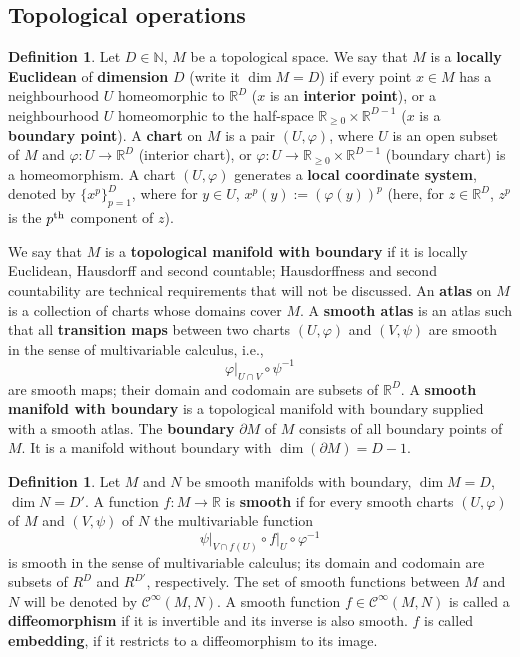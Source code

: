\documentclass{elsarticle}
\theoremstyle{definition}
\newtheorem{definition}[theorem]{Definition}
\newcommand{\N}{\mathbb{N}}
\newcommand{\R}{\mathbb{R}}
\newcommand{\restrict}[2]{\left.#1\right|_{#2}}
\newcommand{\newterm}[1]{\textbf{#1}}
\begin{document}
\subsection{Topological operations}
\label{sec:exterior_calculus/topological}
\begin{definition}
  Let $D \in \N$, $M$ be a topological space.
  We say that $M$ is a \newterm{locally Euclidean} of \newterm{dimension} $D$ (write it $\dim M = D$) if every point $ x \in M$ has
  a neighbourhood $U$ homeomorphic to $\R^D$ ($x$ is an \newterm{interior point}),
  or a neighbourhood $U$ homeomorphic to the half-space $\R_{\geq 0} \times \R^{D - 1}$ ($x$ is a \newterm{boundary point}).
  A \newterm{chart} on $M$ is a pair $(U, \varphi)$, where $U$ is an open subset of $M$ and
  $\varphi \colon U \to \R^D$ (interior chart),
  or $\varphi \colon U \to \R_{\geq 0} \times \R^{D - 1}$ (boundary chart)
  is a homeomorphism.
  A chart $(U, \varphi)$ generates a \newterm{local coordinate system}, denoted by $\{x^p\}_{p = 1}^D$, where for $y \in U$, $x^p(y) := (\varphi(y))^p$ (here, for $z \in \R^D$, $z^p$ is the $p^{\rm th}$ component of $z$).

  We say that $M$ is a \newterm{topological manifold with boundary} if it is locally Euclidean, Hausdorff and second countable; Hausdorffness and second countability are technical requirements that will not be discussed.
  An \newterm{atlas} on $M$ is a collection of charts whose domains cover $M$.
  A \newterm{smooth atlas} is an atlas such that all \newterm{transition maps} between two charts $(U, \varphi)$ and $(V, \psi)$ are smooth in the sense of multivariable calculus, i.e.,
  \begin{equation}
    \restrict{\varphi}{U \cap V} \circ \psi^{-1}
  \end{equation}
  are smooth maps; their domain and codomain are subsets of $\R^D$.
  A \newterm{smooth manifold with boundary} is a topological manifold with boundary supplied with a smooth atlas.
  The \newterm{boundary} $\partial M$ of $M$ consists of all boundary points of $M$.
  It is a manifold without boundary with $\dim(\partial M) = D - 1$.
\end{definition}
\begin{definition}
  Let $M$ and $N$ be smooth manifolds with boundary, $\dim M = D$, $\dim N = D'$.
  A function $f \colon M \to \R$ is \newterm{smooth}
  if for every smooth charts $(U, \varphi)$ of $M$ and $(V, \psi)$ of $N$
  the multivariable function
  \begin{equation}
    \restrict{\psi}{V \cap f(U)} \circ \restrict{f}{U} \circ \varphi^{-1}
  \end{equation}
  is smooth in the sense of multivariable calculus; its domain and codomain are subsets of $R^D$ and $R^{D'}$, respectively.
  The set of smooth functions between $M$ and $N$ will be denoted by $\mathcal{C}^\infty(M, N)$.
  A smooth function $f \in \mathcal{C}^\infty(M, N)$ is called a \newterm{diffeomorphism} if it is invertible and its inverse is also smooth.
  $f$ is called \newterm{embedding}, if it restricts to a diffeomorphism to its image.
\end{definition}
\end{document}
